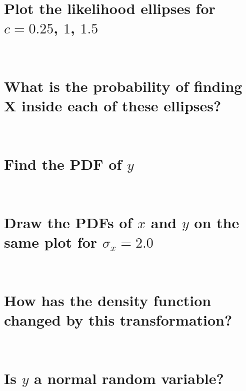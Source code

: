 \documentclass[12pt,letterpaper, onecolumn]{exam}
\begin{document}
\begin{questions}
\begin{parts}
        \part{Plot the likelihood ellipses for $c = 0.25$, $1$, $1.5$}\\
		        \solution
        \part{What is the probability of finding $\mathbf{X}$ inside each of these ellipses?}\\
		        \solution
    \end{parts}
    \clearpage
    \begin{parts}
        \part{Find the PDF of $y$}\\
		        \solution
        \part{Draw the PDFs of $x$ and $y$ on the same plot for $\sigma_x = 2.0$}\\
		        \solution
        \part{How has the density function changed by this transformation?}\\
		        \solution
        \part{Is $y$ a normal random variable?}\\
		        \solution
    \end{parts}
\end{questions}
\end{document}

